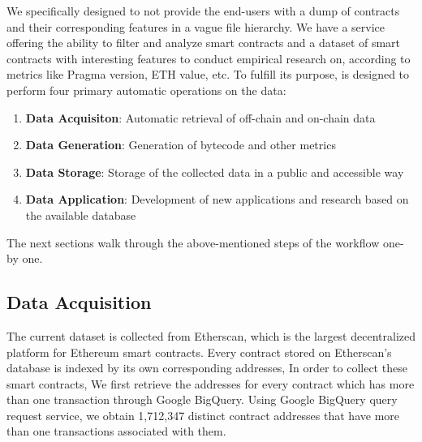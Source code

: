 	We specifically designed \etherbase to not provide the end-users with a dump of contracts and their corresponding features in a vague file hierarchy.
	We have a service offering the ability to filter and analyze smart contracts and a dataset of smart contracts with interesting features to conduct empirical research on, according to metrics like Pragma version, ETH value, etc.
	To fulfill its purpose, \etherbase is designed to perform four primary automatic operations on the data:
	\begin{enumerate}
		\item \textbf{Data Acquisiton}: Automatic retrieval of off-chain and on-chain data
		\item \textbf{Data Generation}: Generation of bytecode and other metrics
		\item \textbf{Data Storage}: Storage of the collected data in a public and accessible way
		\item \textbf{Data Application}: Development of new applications and research based on the available database
	\end{enumerate}

	The next sections walk through the above-mentioned steps of the workflow one-by one.

	\subsection{Data Acquisition}
		The current dataset is collected from Etherscan, which is the largest decentralized platform for Ethereum smart contracts.
		Every contract stored on Etherscan's database is indexed by its own corresponding addresses,
		In order to collect these smart contracts, We first retrieve the addresses for every contract which has more than one transaction through Google BigQuery.
		Using Google BigQuery query request service, we obtain 1,712,347 distinct contract addresses that have more than one transactions associated with them.

